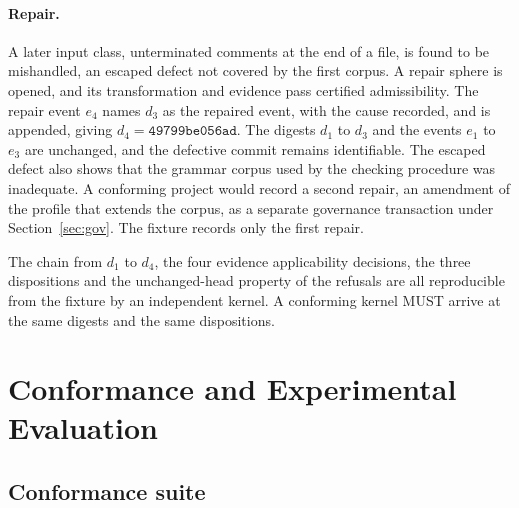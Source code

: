 \documentclass[11pt]{article}
\theoremstyle{remark}
\begin{document}
\paragraph{Repair.} A later input class, unterminated comments at the end of a file, is found to be mishandled, an escaped defect not covered by the first corpus. A repair sphere is opened, and its transformation and evidence pass certified admissibility. The repair event $e_4$ names $d_3$ as the repaired event, with the cause recorded, and is appended, giving $d_4=\texttt{49799be056ad}$. The digests $d_1$ to $d_3$ and the events $e_1$ to $e_3$ are unchanged, and the defective commit remains identifiable. The escaped defect also shows that the grammar corpus used by the checking procedure was inadequate. A conforming project would record a second repair, an amendment of the profile that extends the corpus, as a separate governance transaction under Section~\ref{sec:gov}. The fixture records only the first repair.

The chain from $d_1$ to $d_4$, the four evidence applicability decisions, the three dispositions and the unchanged-head property of the refusals are all reproducible from the fixture by an independent kernel. A conforming kernel MUST arrive at the same digests and the same dispositions.

\section{Conformance and Experimental Evaluation}\label{sec:conf}

\subsection{Conformance suite}
\end{document}
